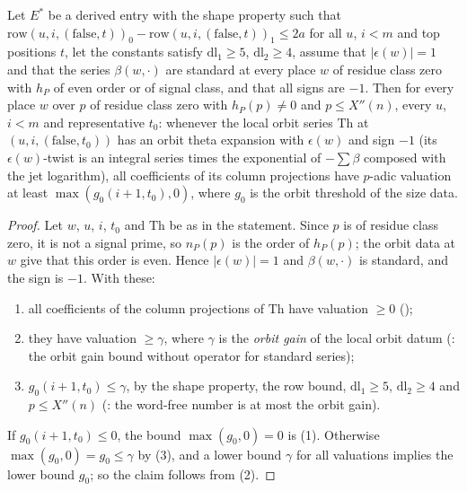\begin{theorem}\label{pf:reckernel:orbitBound}
Let $E^\ast$ be a derived entry with the shape property such that $\mathrm{row}(u,i,(\mathrm{false},t))_0-\mathrm{row}(u,i,(\mathrm{false},t))_1\le2a$ for
all $u$, $i<m$ and top positions $t$, let the constants satisfy $\mathrm{dl}_1\ge5$, $\mathrm{dl}_2\ge4$, assume that
$|\epsilon(w)|=1$ and that the series $\beta(w,\cdot)$ are standard at every place $w$ of residue class zero with
$h_P$ of even order or of signal class, and that all signs are $-1$. Then for every place $w$ over $p$ of residue class zero
with $h_P(p)\ne0$ and $p\le X''(n)$, every $u$, $i<m$ and representative $t_0$: whenever the local orbit series $\mathrm{Th}$ at
$(u,i,(\mathrm{false},t_0))$ has an orbit theta expansion with $\epsilon(w)$ and sign $-1$ (its $\epsilon(w)$-twist is an
integral series times the exponential of $-\sum\beta$ composed with the jet logarithm), all coefficients of its column projections have $p$-adic valuation at
least $\max(g_0(i+1,t_0),0)$, where $g_0$ is the orbit threshold of the size data.
\end{theorem}

\begin{proof}
Let $w$, $u$, $i$, $t_0$ and $\mathrm{Th}$ be as in the statement. Since $p$ is of residue class zero, it is not a signal
prime, so $n_P(p)$ is the order of $h_P(p)$; the orbit data at $w$ give that this order is even. Hence $|\epsilon(w)|=1$ and
$\beta(w,\cdot)$ is standard, and the sign is $-1$. With these:
\begin{enumerate}
\item all coefficients of the column projections of $\mathrm{Th}$ have valuation $\ge0$
  ();
\item they have valuation $\ge\gamma$, where $\gamma$ is the \emph{orbit gain} of the local orbit datum
  (: the orbit gain bound without operator for standard
  series);
\item $g_0(i+1,t_0)\le\gamma$, by the shape property, the row bound, $\mathrm{dl}_1\ge5$, $\mathrm{dl}_2\ge4$ and $p\le X''(n)$
  (: the word-free number is at most the orbit
  gain).
\end{enumerate}
If $g_0(i+1,t_0)\le0$, the bound $\max(g_0,0)=0$ is (1). Otherwise $\max(g_0,0)=g_0\le\gamma$ by (3), and a lower bound
$\gamma$ for all valuations implies the lower bound $g_0$; so the claim follows from (2).
\end{proof}

